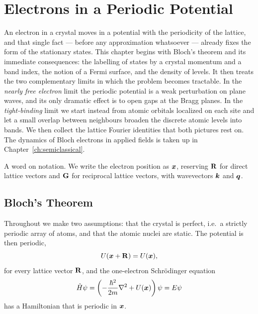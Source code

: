 \chapter{Electrons in a Periodic Potential}
\label{ch:bloch}

An electron in a crystal moves in a potential with the periodicity of the lattice, and that single fact --- before any approximation whatsoever --- already fixes the form of the stationary states. This chapter begins with Bloch's theorem and its immediate consequences: the labelling of states by a crystal momentum and a band index, the notion of a Fermi surface, and the density of levels. It then treats the two complementary limits in which the problem becomes tractable. In the \emph{nearly free electron} limit the periodic potential is a weak perturbation on plane waves, and its only dramatic effect is to open gaps at the Bragg planes. In the \emph{tight-binding} limit we start instead from atomic orbitals localized on each site and let a small overlap between neighbours broaden the discrete atomic levels into bands. We then collect the lattice Fourier identities that both pictures rest on. The dynamics of Bloch electrons in applied fields is taken up in Chapter~\ref{ch:semiclassical}.

A word on notation. We write the electron position as $\bm{x}$, reserving $\cvect{R}$ for direct lattice vectors and $\cvect{G}$ for reciprocal lattice vectors, with wavevectors $\bm{k}$ and $\bm{q}$.

\section{Bloch's Theorem}

Throughout we make two assumptions: that the crystal is perfect, i.e.\ a strictly periodic array of atoms, and that the atomic nuclei are static. The potential is then periodic,
\begin{equation}
    U(\lvect{x}+\cvect{R}) = U(\lvect{x}),
\end{equation}
for every lattice vector $\cvect{R}$, and the one-electron Schrödinger equation
\begin{equation}
    \hat{H}\psi = \left( -\frac{\hbar^2}{2m}\nabla^2 + U(\bm{x}) \right)\psi = E\psi
\end{equation}
has a Hamiltonian that is periodic in $\bm{x}$.

